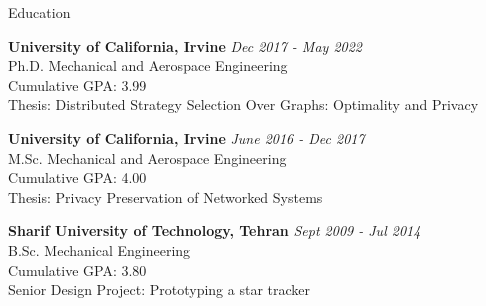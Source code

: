 \begin{rSection}{Education}


{\bf University of California, Irvine} \hfill {\em Dec 2017 - May 2022} 
\\ Ph.D. Mechanical and Aerospace Engineering\hfill 
\\ Cumulative GPA: 3.99 \hfill 
\\ Thesis: Distributed Strategy Selection Over Graphs: Optimality and Privacy\hfill 

{\bf University of California, Irvine} \hfill {\em June 2016 - Dec 2017} 
\\ M.Sc. Mechanical and Aerospace Engineering\hfill 
\\ Cumulative GPA: 4.00 \hfill 
\\ Thesis: Privacy Preservation of Networked Systems\hfill 

{\bf Sharif University of Technology, Tehran} \hfill {\em Sept 2009 - Jul 2014}\\ 
B.Sc. Mechanical Engineering\hfill 
\\ Cumulative GPA: 3.80 \hfill 
\\ Senior Design Project: Prototyping a star tracker\hfill 


\end{rSection}